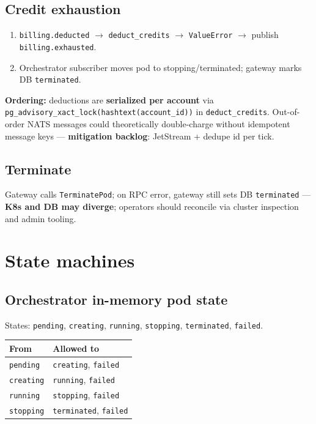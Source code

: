 \documentclass[12pt,a4paper]{article}
\begin{document}
\subsection{Credit exhaustion}
\begin{enumerate}[leftmargin=*]
  \item \texttt{billing.deducted} $\rightarrow$ \texttt{deduct\_credits} $\rightarrow$ \texttt{ValueError} $\rightarrow$ publish \texttt{billing.exhausted}.
  \item Orchestrator subscriber moves pod to stopping/terminated; gateway marks DB \texttt{terminated}.
\end{enumerate}
\textbf{Ordering:} deductions are \textbf{serialized per account} via \texttt{pg\_advisory\_xact\_lock(hashtext(account\_id))} in \texttt{deduct\_credits}. Out-of-order NATS messages could theoretically double-charge without idempotent message keys --- \textbf{mitigation backlog}: JetStream + dedupe id per tick.

\subsection{Terminate}
Gateway calls \texttt{TerminatePod}; on RPC error, gateway still sets DB \texttt{terminated} --- \textbf{K8s and DB may diverge}; operators should reconcile via cluster inspection and admin tooling.

\section{State machines}
\label{app:state-machines}

\subsection{Orchestrator in-memory pod state}
States: \texttt{pending}, \texttt{creating}, \texttt{running}, \texttt{stopping}, \texttt{terminated}, \texttt{failed}.

\begin{tabularx}{\textwidth}{@{}L{3.5cm} X@{}}
  \toprule
  \textbf{From} & \textbf{Allowed to} \\
  \midrule
  \texttt{pending} & \texttt{creating}, \texttt{failed} \\
  \texttt{creating} & \texttt{running}, \texttt{failed} \\
  \texttt{running} & \texttt{stopping}, \texttt{failed} \\
  \texttt{stopping} & \texttt{terminated}, \texttt{failed} \\
  \bottomrule
\end{tabularx}
\end{document}
